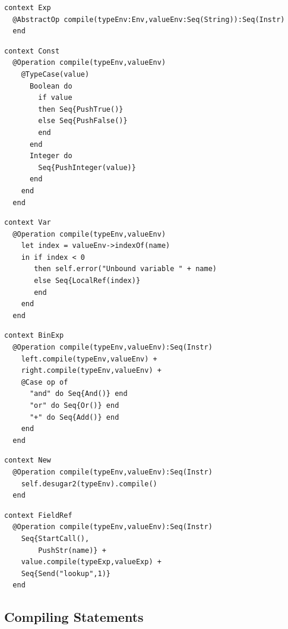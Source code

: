 \begin{lstlisting}
context Exp
  @AbstractOp compile(typeEnv:Env,valueEnv:Seq(String)):Seq(Instr)
  end
\end{lstlisting}\begin{lstlisting}
context Const
  @Operation compile(typeEnv,valueEnv)
    @TypeCase(value)
      Boolean do 
        if value 
        then Seq{PushTrue()} 
        else Seq{PushFalse()} 
        end 
      end
      Integer do 
        Seq{PushInteger(value)}
      end
    end
  end
\end{lstlisting}\begin{lstlisting}
context Var
  @Operation compile(typeEnv,valueEnv)
    let index = valueEnv->indexOf(name)
    in if index < 0
       then self.error("Unbound variable " + name)
       else Seq{LocalRef(index)}
       end
    end
  end
\end{lstlisting}\begin{lstlisting}
context BinExp
  @Operation compile(typeEnv,valueEnv):Seq(Instr)
    left.compile(typeEnv,valueEnv) + 
    right.compile(typeEnv,valueEnv) +
    @Case op of
      "and" do Seq{And()} end
      "or" do Seq{Or()} end
      "+" do Seq{Add()} end
    end
  end
\end{lstlisting}\begin{lstlisting}
context New
  @Operation compile(typeEnv,valueEnv):Seq(Instr)
    self.desugar2(typeEnv).compile()
  end
\end{lstlisting}\begin{lstlisting}
context FieldRef
  @Operation compile(typeEnv,valueEnv):Seq(Instr)
    Seq{StartCall(),
        PushStr(name)} +
    value.compile(typeExp,valueExp) +
    Seq{Send("lookup",1)}
  end
\end{lstlisting}
\subsection{Compiling Statements}

